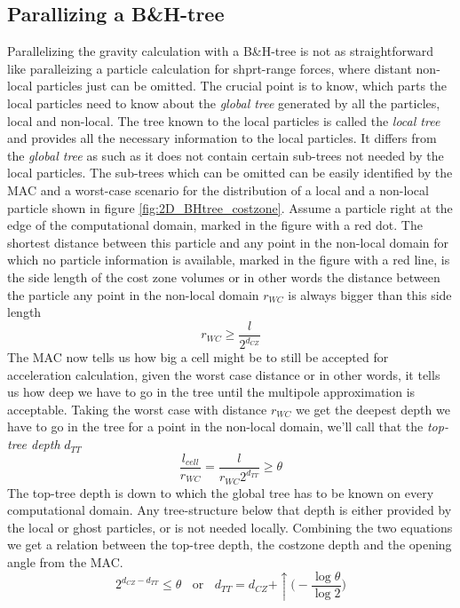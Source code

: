 \subsection{Parallizing a B\&H-tree}
Parallelizing the gravity calculation with a  B\&H-tree is not as straightforward like paralleizing a particle calculation for shprt-range forces, where distant non-local particles just can be omitted. The crucial point is to know, which parts the local particles need to know about the \emph{global tree} generated by all the particles, local and non-local. The tree known to the local particles is called the \emph{local tree} and provides all the necessary information to the local particles. It differs from the \emph{global tree} as such as it does not contain certain sub-trees not needed by the local particles. The sub-trees which can be omitted can be easily identified by the MAC and a worst-case scenario for the distribution of a local and a non-local particle shown in figure \ref{fig:2D_BHtree_costzone}. Assume a particle right at the edge of the computational domain, marked in the figure with a red dot. The shortest distance between this particle and any point in the non-local domain for which no particle information is available, marked in the figure with a red line, is the side length of the cost zone volumes or in other words the distance between the particle any point in the non-local domain $r_{WC}$ is always bigger than this side length
\begin{equation}
r_{WC} \ge \frac{l}{2^{d_{CZ}} } 
\end{equation}
The MAC now tells us how big a cell might be to still be accepted for acceleration calculation, given the worst case distance or in other words, it tells us how deep we have to go in the tree until the multipole approximation is acceptable. Taking the worst case with distance $r_{WC}$ we get the deepest depth we have to go in the tree for a point in the non-local domain, we'll call that the \emph{top-tree depth} $d_{TT}$
\begin{equation}
\frac{l_{cell}}{r_{WC}} = \frac{l}{r_{WC} 2^{d_{TT}}} \ge \theta
\end{equation}
The top-tree depth is down to which the global tree has to be known on every computational domain. Any tree-structure below that depth is either provided by the local or ghost particles, or is not needed locally. Combining the two equations we get a relation between the top-tree depth, the costzone depth and the opening angle from the MAC.
\begin{equation}
2^{d_{CZ} - d_{TT}} \le \theta ~~~~\text{or}~~~~ d_{TT} = d_{CZ} + \uparrow \Big( - \frac{ \log{\theta} }{\log{2} } \Big)
\end{equation}
